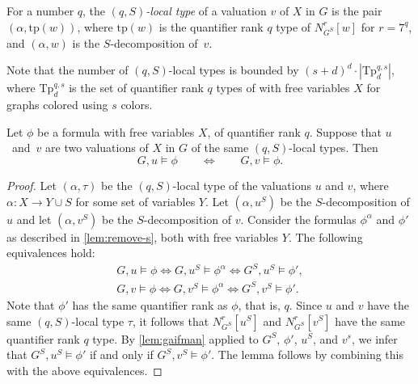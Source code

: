 For a number $q$, the \emph{$(q,S)$-local type} of a valuation $v$ of $X$ in $G$
is the pair $(\alpha,\mathrm{tp}(w))$,
where $\mathrm{tp}(w)$ is the quantifier rank $q$
type of  $N^r_{G^S}[w]$ for $r=7^q$,
and $(\alpha,w)$ is the $S$-decomposition of~$v$.

Note that the number of $(q,S)$-local types is bounded by 
$(s+d)^d\cdot |\mathrm{Tp}^{q,s}_{d}|$,
where $\mathrm{Tp}^{q,s}_{d}$
is the set of quantifier rank $q$ types of 
with free variables $X$ for graphs colored using $s$ colors.




\begin{lemma}\label{lem:coloring}
	Let $\phi$ be a formula with
free variables $X$, of quantifier rank $q$.
	Suppose that $u$~and~$v$ are two valuations of $X$  in $G$ of the same $(q,S)$-local types.
	Then $$G,u\models \phi\qquad \iff\qquad G,v\models \phi.$$
\end{lemma}
\begin{proof}
Let $(\alpha,\tau)$ be the $(q,S)$-local type of the valuations $u$ and $v$, where $\alpha:X\to Y\cup S$ for some set of variables $Y$. Let $(\alpha,u^S)$ be the $S$-decomposition of $u$
and let $(\alpha,v^S)$ be the $S$-decomposition of $v$.
	Consider the formulas $\phi^{\alpha}$ and $\phi'$ as described in \cref{lem:remove-s}, both with free variables $Y$.
	The following equivalences hold:
	\begin{align*}
	G,u\models\phi\iff G,u^S\models\phi^{\alpha}\iff G^S,u^S\models\phi',\\
	G,v\models\phi\iff G,v^S\models\phi^{\alpha}\iff G^S,v^S\models\phi'.
	\end{align*}
		Note that $\phi'$ has the same quantifier rank as  $\phi$, that is, $q$.
		Since $u$ and $ v$ have the same $(q,S)$-local type $\tau$, it follows that $N^r_{G^S}[u^S]$ and $N^r_{G^S}[v^S]$ have the same quantifier rank $q$ type.
		By \cref{lem:gaifman} applied to $G^S$, $\phi'$, $ u^S$, and $ v^s$, we infer that $G^S,u^S\models\phi'$ if and only if $G^S,v^S\models\phi'$.
		The lemma follows by combining this with the above equivalences.
\end{proof}

